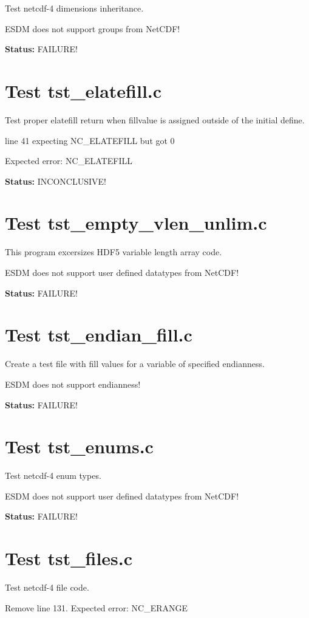 Test netcdf-4 dimensions inheritance.

ESDM does not support groups from NetCDF!

{\bf \large Status: } FAILURE!

\section{Test tst\_elatefill.c}

Test proper elatefill return when fillvalue is assigned outside of
the initial define.

line 41 expecting NC\_ELATEFILL but got 0

Expected error: NC\_ELATEFILL

{\bf \large Status: } INCONCLUSIVE!

\section{Test tst\_empty\_vlen\_unlim.c}

This program excersizes HDF5 variable length array code.

ESDM does not support user defined datatypes from NetCDF!

{\bf \large Status: } FAILURE!

\section{Test tst\_endian\_fill.c}

Create a test file with fill values for a variable of specified endianness.

ESDM does not support endianness!

{\bf \large Status: } FAILURE!

\section{Test tst\_enums.c}

Test netcdf-4 enum types.

ESDM does not support user defined datatypes from NetCDF!

{\bf \large Status: } FAILURE!

\section{Test tst\_files.c}

Test netcdf-4 file code.

Remove line 131. Expected error: NC\_ERANGE

